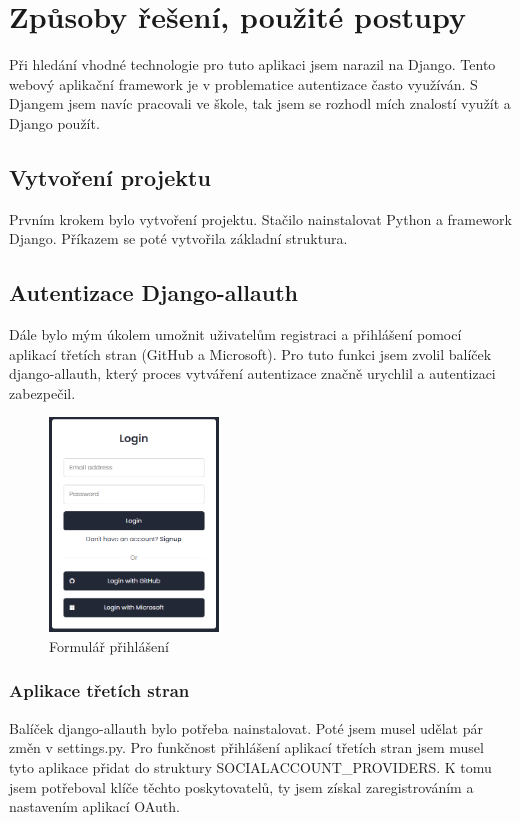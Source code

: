 \documentclass[12pt, a4paper,
twoside,        %
openright
]{report}
\begin{document}
\chapter{Způsoby řešení, použité postupy}
Při hledání vhodné technologie pro tuto aplikaci jsem narazil na Django. Tento webový aplikační framework je v problematice autentizace často využíván. S Djangem jsem navíc pracovali ve škole, tak jsem se rozhodl mích znalostí využít a Django použít.

\section{Vytvoření projektu}
\label{sec:vytvoreniprojektu}
Prvním krokem bylo vytvoření projektu. Stačilo nainstalovat Python a framework Django. Příkazem se poté vytvořila základní struktura.

\section{Autentizace Django-allauth}
\label{sec:autentizacedjango-allauth}
Dále bylo mým úkolem umožnit uživatelům registraci a přihlášení pomocí aplikací třetích stran (GitHub a Microsoft). Pro tuto funkci jsem zvolil balíček django-allauth, který proces vytváření autentizace značně urychlil a autentizaci zabezpečil.
	\begin{figure}[h!]
		\centering
		\includegraphics[width=0.4\textwidth]{image/login.png}
		\caption{Formulář přihlášení}
		\label{fig:formularprihlaseni}
	\end{figure}

\subsection{Aplikace třetích stran}
Balíček django-allauth bylo potřeba nainstalovat. Poté jsem musel udělat pár změn v settings.py. Pro funkčnost přihlášení aplikací třetích stran jsem musel tyto aplikace přidat do struktury SOCIALACCOUNT\_PROVIDERS. K tomu jsem potřeboval klíče těchto poskytovatelů, ty jsem získal zaregistrováním a nastavením aplikací OAuth.
\end{document}
